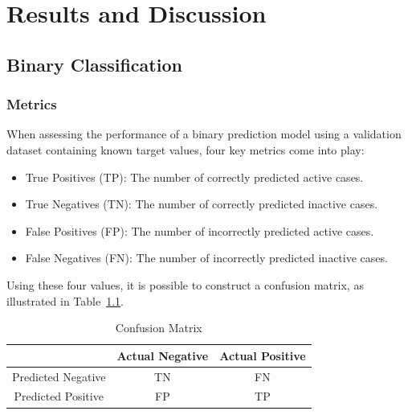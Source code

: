 \chapter{Results and Discussion}\label{chap:results_discussion}
\section{Binary Classification}
\subsection{Metrics}
When assessing the performance of a binary prediction model using a validation dataset containing known target values, four key metrics come into play:

\begin{itemize}
  \item True Positives (TP): The number of correctly predicted active cases.
  \item True Negatives (TN): The number of correctly predicted inactive cases.
  \item False Positives (FP): The number of incorrectly predicted active cases.
  \item False Negatives (FN): The number of incorrectly predicted inactive cases.
\end{itemize}


Using these four values, it is possible to construct a confusion matrix, as illustrated in Table~\ref{tab:confusion_matrix}.

\begin{table}[h]
  \centering
  \caption{Confusion Matrix}
  \label{tab:confusion_matrix}
  \setlength{\tabcolsep}{10pt} %
  \renewcommand{\arraystretch}{1.5} %
  \begin{tabular}{|c|c|c|}
  \cline{2-3}
  \multicolumn{1}{c|}{} & Actual Negative & Actual Positive \\
  \hline
  Predicted Negative & TN & FN \\
  \hline
  Predicted Positive & FP & TP \\
  \hline
  \end{tabular}
\end{table}

